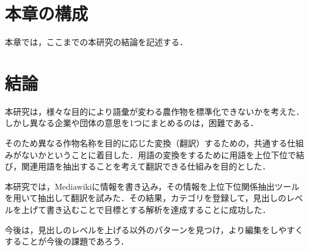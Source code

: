 \section{本章の構成}
本章では，ここまでの本研究の結論を記述する．

\section{結論}
本研究は，様々な目的により語彙が変わる農作物を標準化できないかを考えた．しかし異なる企業や団体の意思を1つにまとめるのは，困難である．

そのため異なる作物名称を目的に応じた変換（翻訳）するための，共通する仕組みがないかということに着目した．用語の変換をするために用語を上位下位で結び，関連用語を抽出することを考えて翻訳できる仕組みを目的とした．

本研究では，Mediawikiに情報を書き込み，その情報を上位下位関係抽出ツールを用いて抽出して翻訳を試みた．その結果，カテゴリを登録して，見出しのレベルを上げて書き込むことで目標とする解析を達成することに成功した．

今後は，見出しのレベルを上げる以外のパターンを見つけ，より編集をしやすくすることが今後の課題であろう．







